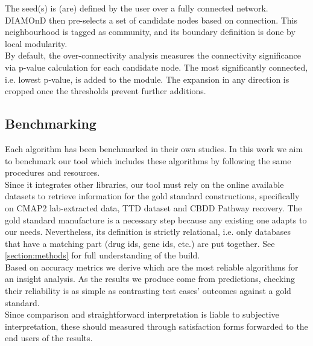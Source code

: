 The seed(s) is (are) defined by the user over a fully connected network. DIAMOnD then pre-selects a set of candidate nodes based on connection. This neighbourhood is tagged as community, and its boundary definition is done by local modularity.
\\

By default, the over-connectivity analysis measures the connectivity significance via p-value calculation for each candidate node. The most significantly connected, i.e. lowest p-value, is added to the module. The expansion in any direction is cropped once the thresholds prevent further additions.

\subsection{Benchmarking}
Each algorithm has been benchmarked in their own studies. In this work we aim to benchmark our tool which includes these algorithms by following the same procedures and resources. 
\\

Since it integrates other libraries, our tool must rely on the online available datasets to retrieve information for the gold standard constructions, specifically on CMAP2 lab-extracted data, TTD dataset and CBDD Pathway recovery. The gold standard manufacture is a necessary step because any existing one adapts to our needs. Nevertheless, its definition is strictly relational, i.e. only databases that have a matching part (drug ids, gene ids, etc.) are put together. See \ref{section:methods} for full understanding of the build.
\\

Based on accuracy metrics we derive which are the most reliable algorithms for an insight analysis.  As the results we produce come from predictions, checking their reliability is as simple as contrasting test cases’ outcomes against a gold standard.
\\

Since comparison and straightforward interpretation is liable to subjective interpretation, these should measured through satisfaction forms forwarded to the end users of the results.